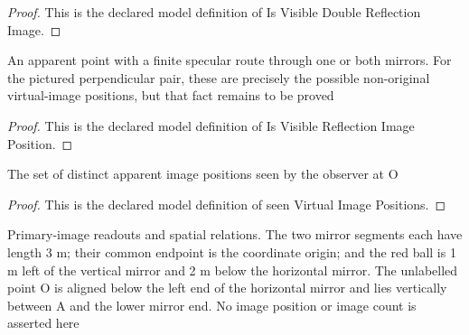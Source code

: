 \begin{proof}
  This is the declared model definition of Is Visible Double Reflection Image.
\end{proof}
\begin{definition}
  \label{def:physics:phyx-mini-0068:phyxminiproblems-problemphyxmini0068-isvisiblereflectionimageposition}
  An apparent point with a finite specular route through one or both mirrors. For the pictured perpendicular pair, these are precisely the possible non-original virtual-image positions, but that fact remains to be proved
\end{definition}
\begin{proof}
  This is the declared model definition of Is Visible Reflection Image Position.
\end{proof}
\begin{definition}
  \label{def:physics:phyx-mini-0068:phyxminiproblems-problemphyxmini0068-seenvirtualimagepositions}
  The set of distinct apparent image positions seen by the observer at O
\end{definition}
\begin{proof}
  This is the declared model definition of seen Virtual Image Positions.
\end{proof}
\begin{definition}
  \label{def:physics:phyx-mini-0068:phyxminiproblems-problemphyxmini0068-matchesperpendicularmirrorfigure}
  Primary-image readouts and spatial relations. The two mirror segments each have length 3 m; their common endpoint is the coordinate origin; and the red ball is 1 m left of the vertical mirror and 2 m below the horizontal mirror. The unlabelled point O is aligned below the left end of the horizontal mirror and lies vertically between A and the lower mirror end. No image position or image count is asserted here
\end{definition}
